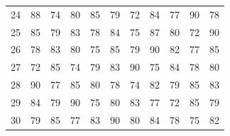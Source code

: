 \documentclass[11pt]{article}
\begin{document}
\begin{table}[htbp]
{\begin{tabular}{c|cccccccccc}
24 & 88 & 74 & 80 & 85 & 79 & 72 & 84 & 77 & 90 & 78 \\
25 & 85 & 79 & 83 & 78 & 84 & 75 & 87 & 80 & 72 & 90 \\
26 & 78 & 83 & 80 & 75 & 85 & 79 & 90 & 82 & 77 & 85 \\
27 & 72 & 85 & 74 & 79 & 83 & 90 & 75 & 84 & 78 & 80 \\
28 & 90 & 77 & 85 & 80 & 78 & 74 & 82 & 79 & 85 & 83 \\
29 & 84 & 79 & 90 & 75 & 80 & 83 & 77 & 72 & 85 & 79 \\
30 & 79 & 85 & 77 & 83 & 90 & 80 & 84 & 78 & 75 & 82 \\
\end{tabular}
}
\end{table}
\end{document}
